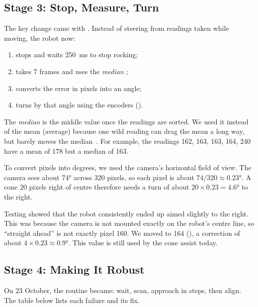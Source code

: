 \subsection{Stage 3: Stop, Measure, Turn}

The key change came with . Instead of steering from readings
taken while moving, the robot now:

\begin{enumerate}
  \item stops and waits 250~ms to stop rocking;
  \item takes 7 frames and uses the \emph{median} ;
  \item converts the error in pixels into an angle;
  \item turns by that angle using the encoders ().
\end{enumerate}

The \emph{median} is the middle value once the readings are sorted. We used it
instead of the mean (average) because one wild reading can drag the mean a long
way, but barely moves the median~\cite{tukey1977}. For example, the readings 162,
163, 163, 164, 240 have a mean of 178 but a median of 163.

To convert pixels into degrees, we used the camera's horizontal field of view.
The camera sees about 74° across 320 pixels, so each pixel is about
$74/320 \approx 0.23°$. A cone 20 pixels right of centre therefore needs a turn of
about $20 \times 0.23 = 4.6°$ to the right.

Testing showed that the robot consistently ended up aimed slightly to the right.
This was because the camera is not mounted exactly on the robot's centre line,
so ``straight ahead'' is not exactly pixel 160. We moved
 to 164 (), a correction of about
$4 \times 0.23 \approx 0.9°$. This value is still used by the cone assist today.

\subsection{Stage 4: Making It Robust}

On 23 October, the routine became: wait, scan, approach in steps, then align. The
table below lists each failure and its fix.

